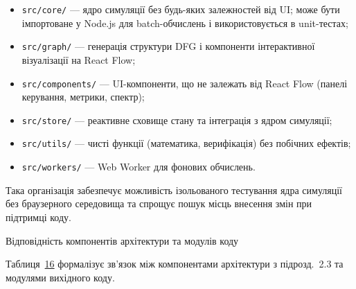 \begin{itemize}
\item
  \texttt{src/core/} --- ядро симуляції без будь-яких залежностей від
  UI; може бути імпортоване у Node.js для batch-обчислень і
  використовується в unit-тестах;
\item
  \texttt{src/graph/} --- генерація структури DFG і компоненти
  інтерактивної візуалізації на React Flow;
\item
  \texttt{src/components/} --- UI-компоненти, що не залежать від React
  Flow (панелі керування, метрики, спектр);
\item
  \texttt{src/store/} --- реактивне сховище стану та інтеграція з ядром
  симуляції;
\item
  \texttt{src/utils/} --- чисті функції (математика, верифікація) без
  побічних ефектів;
\item
  \texttt{src/workers/} --- Web Worker для фонових обчислень.
\end{itemize}

Така організація забезпечує можливість ізольованого тестування ядра
симуляції без браузерного середовища та спрощує пошук місць внесення
змін при підтримці коду.

Відповідність компонентів архітектури та модулів коду

Таблиця~\hyperref[tab:arch_to_code]{16} формалізує зв'язок між
компонентами архітектури з підрозд.~2.3 та модулями вихідного коду.

